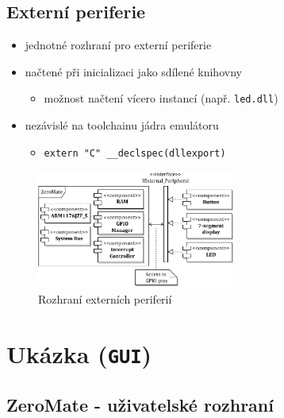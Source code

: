 \documentclass[compress]{beamer}
\begin{document}
\subsection{Externí periferie}

\begin{frame}
	
	\begin{itemize}
		\item jednotné rozhraní pro externí periferie
		\item načtené při inicializaci jako sdílené knihovny
		\begin{itemize}
			\item možnost načtení vícero instancí (např. \texttt{led.dll})
		\end{itemize}
		\item nezávislé na toolchainu jádra emulátoru
		\begin{itemize}
			\item \texttt{extern "C" \_\_declspec(dllexport)}
		\end{itemize}
	\end{itemize}
	\begin{figure}
		\centering
		\includegraphics[width=0.58\textwidth]{img/peripheral_interface.pdf}
		\caption{Rozhraní externích periferií}
	\end{figure}
\end{frame}

\section{Ukázka (\texttt{GUI})}

\subsection{ZeroMate - uživatelské rozhraní}
\end{document}
